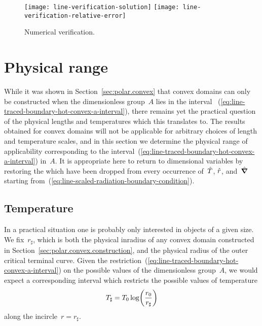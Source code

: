 \begin{figure}
  \newcommand*{\subfigurewidth}{0.42\textwidth}
  \centering
  \hspace*{\fill}
  \texttt{[image: line-verification-solution]}
    \hfill
  \texttt{[image: line-verification-relative-error]}
  \hspace*{\fill}
  \caption{
    Numerical verification.
  }
  \label{fig:line-verification}
\end{figure}

\section{Physical range}
\label{sec:polar.physical}

While it was shown in Section~\ref{sec:polar.convex} that
convex domains can only be constructed
when the dimensionless group~$A$ lies in the interval~%
  (\ref{eq:line-traced-boundary-hot-convex-a-interval}),
there remains yet the practical question of
the physical lengths and temperatures which this translates to.
The results obtained for convex domains
will not be applicable for arbitrary choices
of length and temperature scales,
and in this section we determine the physical range of applicability
corresponding to
the interval~(\ref{eq:line-traced-boundary-hot-convex-a-interval}) in~$A$.
It is appropriate here to return to dimensional variables
by restoring the \scalingmarks{} which have been dropped
from every occurrence of~$\hat{T}$, $\hat{r}$, and~$\mathop{}\!\hat{\mathop{}\!\boldsymbol{\mathbf{\nabla}}}$
starting from~(\ref{eq:line-scaled-radiation-boundary-condition}).

\subsection{Temperature}
\label{sec:polar.physical.temperature}

In a practical situation
one is probably only interested in objects of a given size.
We fix~$r_\sharp$, which is both the physical inradius of any convex domain
constructed in Section~\ref{sec:polar.convex.construction},
and the physical radius of the outer critical terminal curve.
Given the restriction~(\ref{eq:line-traced-boundary-hot-convex-a-interval})
on the possible values of the dimensionless group~$A$,
we would expect a corresponding interval
which restricts the possible values of temperature
\begin{equation}
  T_\sharp = T_0 \log \roundbr*{\frac{r_0}{r_\sharp}}
  \label{eq:line-t-sharp}
\end{equation}
along the incircle~$r = r_\sharp$.

